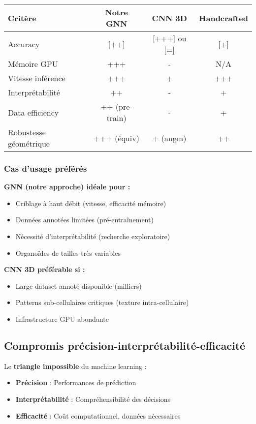 \begin{center}
\begin{tabular}{|l|c|c|c|}
\hline
\textbf{Critère} & \textbf{Notre GNN} & \textbf{CNN 3D} & \textbf{Handcrafted} \\
\hline
Accuracy & [++] & [+++] ou [=] & [+] \\
Mémoire GPU & +++ & - & N/A \\
Vitesse inférence & +++ & + & +++ \\
Interprétabilité & ++ & - & + \\
Data efficiency & ++ (pre-train) & - & + \\
Robustesse géométrique & +++ (équiv) & + (augm) & ++ \\
\hline
\end{tabular}
\end{center}

\subsubsection{Cas d'usage préférés}

\textbf{GNN (notre approche) idéale pour :}
\begin{itemize}
    \item Criblage à haut débit (vitesse, efficacité mémoire)
    \item Données annotées limitées (pré-entraînement)
    \item Nécessité d'interprétabilité (recherche exploratoire)
    \item Organoïdes de tailles très variables
\end{itemize}

\textbf{CNN 3D préférable si :}
\begin{itemize}
    \item Large dataset annoté disponible (milliers)
    \item Patterns sub-cellulaires critiques (texture intra-cellulaire)
    \item Infrastructure GPU abondante
\end{itemize}

\subsection{Compromis précision-interprétabilité-efficacité}

Le \textbf{triangle impossible} du machine learning :
\begin{itemize}
    \item \textbf{Précision} : Performances de prédiction
    \item \textbf{Interprétabilité} : Compréhensibilité des décisions
    \item \textbf{Efficacité} : Coût computationnel, données nécessaires
\end{itemize}

